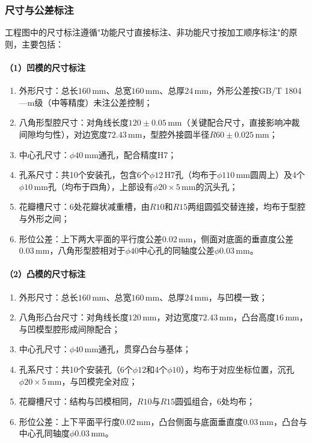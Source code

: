 \documentclass{xautCADreport}
\begin{document}
\subsubsection{尺寸与公差标注}

工程图中的尺寸标注遵循"功能尺寸直接标注、非功能尺寸按加工顺序标注"的原则，主要包括：

\paragraph{（1）凹模的尺寸标注}

\begin{enumerate}
  \item 外形尺寸：总长$160\,\mathrm{mm}$、总宽$160\,\mathrm{mm}$、总厚$24\,\mathrm{mm}$，外形公差按GB/T 1804—m级（中等精度）未注公差控制；
  \item 八角形型腔尺寸：对角线长度$120\pm0.05\,\mathrm{mm}$（关键配合尺寸，直接影响冲裁间隙均匀性），对边宽度$72.43\,\mathrm{mm}$，型腔外接圆半径$R60\pm0.025\,\mathrm{mm}$；
  \item 中心孔尺寸：$\phi40\,\mathrm{mm}$通孔，配合精度H7；
  \item 孔系尺寸：共10个安装孔，包含6个$\phi12\,\mathrm{H7}$孔（均布于$\phi110\,\mathrm{mm}$圆周上）及4个$\phi10\,\mathrm{mm}$孔（均布于四角），上部设有$\phi20\times5\,\mathrm{mm}$的沉头孔；
  \item 花瓣槽尺寸：6处花瓣状减重槽，由$R10$和$R15$两组圆弧交替连接，均布于型腔与外形之间；
  \item 形位公差：上下两大平面的平行度公差$0.02\,\mathrm{mm}$，侧面对底面的垂直度公差$0.03\,\mathrm{mm}$，八角形型腔相对于$\phi40$中心孔的同轴度公差$\phi0.03\,\mathrm{mm}$。
\end{enumerate}

\paragraph{（2）凸模的尺寸标注}

\begin{enumerate}
  \item 外形尺寸：总长$160\,\mathrm{mm}$、总宽$160\,\mathrm{mm}$、总厚$24\,\mathrm{mm}$，与凹模一致；
  \item 八角形凸台尺寸：对角线长度$120\,\mathrm{mm}$，对边宽度$72.43\,\mathrm{mm}$，凸台高度$16\,\mathrm{mm}$，与凹模型腔形成间隙配合；
  \item 中心孔尺寸：$\phi40\,\mathrm{mm}$通孔，贯穿凸台与基体；
  \item 孔系尺寸：共10个安装孔（6个$\phi12$和4个$\phi10$），均布于对应坐标位置，沉孔$\phi20\times5\,\mathrm{mm}$，与凹模完全对应；
  \item 花瓣槽尺寸：结构与凹模相同，$R10$与$R15$圆弧组合，6处均布；
  \item 形位公差：上下平面平行度$0.02\,\mathrm{mm}$，凸台侧面与底面垂直度$0.03\,\mathrm{mm}$，凸台与中心孔同轴度$\phi0.03\,\mathrm{mm}$。
\end{enumerate}
\end{document}
